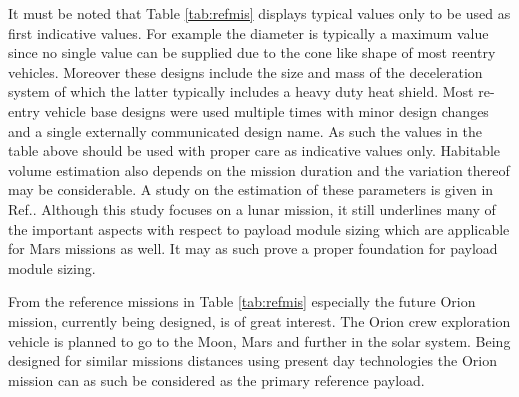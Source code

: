 It must be noted that Table \ref{tab:refmis} displays typical values only to be used as first indicative values. For example the diameter is typically a maximum value since no single value can be supplied due to the cone like shape of most reentry vehicles. Moreover these designs include the size and mass of the deceleration system of which the latter typically includes a heavy duty heat shield. Most re-entry vehicle base designs were used multiple times with minor design changes and a single externally communicated design name. As such the values in the table above should be used with proper care as indicative values only. Habitable volume estimation also depends on the mission duration and the variation thereof may be considerable. A study on the estimation of these parameters is given in Ref.\cite{Rudisill2008}. Although this study focuses on a lunar mission, it still underlines many of the important aspects with respect to payload module sizing which are applicable for Mars missions as well. It may as such prove a proper foundation for payload module sizing. 

From the reference missions in Table \ref{tab:refmis} especially the future Orion mission, currently being designed, is of great interest. The Orion crew exploration vehicle is planned to go to the Moon, Mars and further in the solar system. Being designed for similar missions distances using present day technologies the Orion mission can as such be considered as the primary reference payload.


